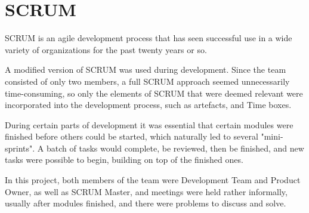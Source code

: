   \section{SCRUM}
  SCRUM is an agile development process that has seen successful use in a wide variety of organizations for the past twenty years or so.
  
  A modified version of SCRUM was used during development. Since the team consisted of only two members, a full SCRUM approach seemed unnecessarily time-consuming, so only the elements of SCRUM that were deemed relevant were incorporated into the development process, such as artefacts, and Time boxes. 
  
  During certain parts of development it was essential that certain modules were finished before others could be started, which naturally led to several "mini-sprints". A batch of tasks would complete, be reviewed, then be finished, and new tasks were possible to begin, building on top of the finished ones.
  
  In this project, both members of the team were Development Team and Product Owner, as well as SCRUM Master, and meetings were held rather informally, usually after modules finished, and there were problems to discuss and solve. 